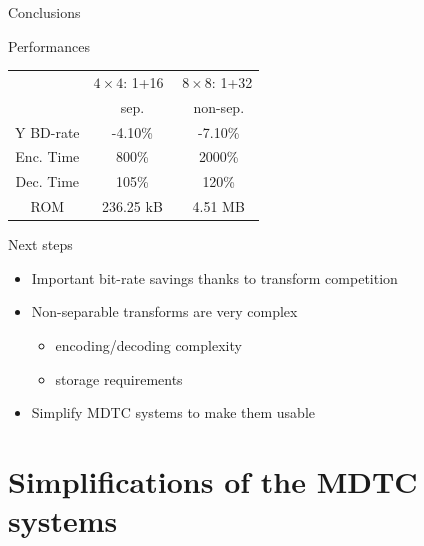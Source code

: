 \documentclass[10pt]{beamer} %
\begin{document}
\begin{frame}{Conclusions}
	\centering
	\begin{block}{Performances}
		\scriptsize
		\centering
		\begin{tabular}{ccc}
			\multicolumn{1}{c}{} &
			\multicolumn{2}{c}{\multirow{2}{2.75cm}{\centering $4\times4$: 1+16 $\quad 8\times8$: 1+32}} \\
			\multicolumn{1}{c}{} & & \\
			\cline{2-3}
			\multicolumn{1}{c}{} & \multicolumn{1}{c|}{sep.} & non-sep. \\
			\hline
			\hline
			\multicolumn{1}{c|}{Y BD-rate} & \multicolumn{1}{c|}{-4.10\%}   & -7.10\% \\
			\multicolumn{1}{c|}{Enc. Time} & \multicolumn{1}{c|}{800\%  }   & 2000\% \\
			\multicolumn{1}{c|}{Dec. Time} & \multicolumn{1}{c|}{105\%  }   & 120\% \\
			\multicolumn{1}{c|}{ROM}       & \multicolumn{1}{c|}{236.25 kB} & 4.51 MB \\
		\end{tabular}
	\end{block}
	\begin{block}{Next steps}
		\begin{itemize}
			\item Important bit-rate savings thanks to transform competition
			\item Non-separable transforms are very complex
				\begin{itemize}
					\item encoding/decoding complexity
					\item storage requirements
				\end{itemize}
			\item Simplify MDTC systems to make them usable
		\end{itemize}
	\end{block}
\end{frame}

\section[MDTC simplifications]{Simplifications of the MDTC systems}

\end{document}
